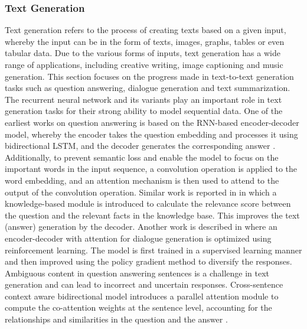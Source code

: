 \documentclass[preprint,12pt]{elsarticle}
\begin{document}
\subsubsection{Text Generation}
Text generation refers to the process of creating texts based on a given input, whereby the input can be in the form of texts, images, graphs, tables or even tabular data. Due to the various forms of inputs, text generation has a wide range of applications, including creative writing, image captioning and music generation. This section focuses on the progress made in text-to-text generation tasks such as question answering, dialogue generation and text summarization. The recurrent neural network and its variants play an important role in text generation tasks for their strong ability to model sequential data. One of the earliest works on question answering is based on the RNN-based encoder-decoder model, whereby the encoder takes the question embedding and processes it using bidirectional LSTM, and the decoder generates the corresponding answer \citep{nie_attention-based_2017}. Additionally, to prevent semantic loss and enable the model to focus on the important words in the input sequence, a convolution operation is applied to the word embedding, and an attention mechanism is then used to attend to the output of the convolution operation. Similar work is reported in \citep{yin_neural_2015} in which a knowledge-based module is introduced to calculate the relevance score between the question and the relevant facts in the knowledge base. This improves the text (answer) generation by the decoder. Another work is described in \citep{li_deep_2016} where an encoder-decoder with attention for dialogue generation is optimized using reinforcement learning. The model is first trained in a supervised learning manner and then improved using the policy gradient method to diversify the responses. Ambiguous content in question answering sentences is a challenge in text generation and can lead to incorrect and uncertain responses. Cross-sentence context aware bidirectional model introduces a parallel attention module to compute the co-attention weights at the sentence level, accounting for the relationships and similarities in the question and the answer \citep{wu_building_2020}.
\end{document}
